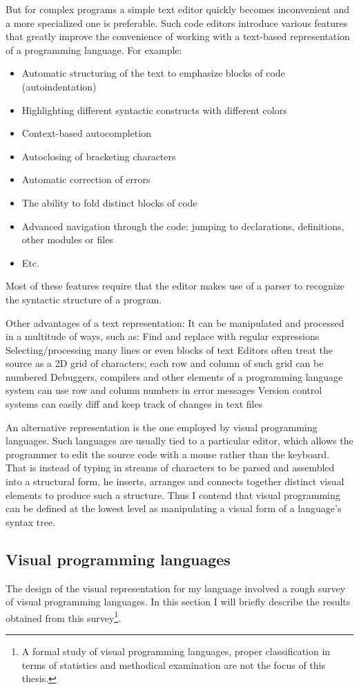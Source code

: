 But for complex programs a simple text editor quickly becomes inconvenient and a more specialized one is preferable. Such code editors introduce various features that greatly improve the convenience of working with a text-based representation of a programming language. For example:
\begin{itemize}
	\item Automatic structuring of the text to emphasize blocks of code (autoindentation)
	\item Highlighting different syntactic constructs with different colors
	\item Context-based autocompletion
	\item Autoclosing of bracketing characters
	\item Automatic correction of errors
	\item The ability to fold distinct blocks of code
	\item Advanced navigation through the code: jumping to declarations, definitions, other modules or files
	\item Etc.
\end{itemize}
Most of these features require that the editor makes use of a parser to recognize the syntactic structure of a program.

Other advantages of a text representation:
It can be manipulated and processed in a multitude of ways, such as:
Find and replace with regular expressions
Selecting/processing many lines or even blocks of text
Editors often treat the source as a 2D grid of characters; each row and column of such grid can be numbered
Debuggers, compilers and other elements of a programming language system can use row and column numbers in error messages
Version control systems can easily diff and keep track of changes in text files

An alternative representation is the one employed by visual programming languages. Such languages are usually tied to a particular editor, which allows the programmer to edit the source code with a mouse rather than the keyboard. That is instead of typing in streams of characters to be parsed and assembled into a structural form, he inserts, arranges and connects together distinct visual elements to produce such a structure. Thus I contend that visual programming can be defined at the lowest level as manipulating a visual form of a language's syntax tree.

\subsection{Visual programming languages}
The design of the visual representation for my language involved a rough survey of visual programming languages. In this section I will briefly describe the results obtained from this survey\footnote{A formal study of visual programming languages, proper classification in terms of statistics and methodical examination are not the focus of this thesis.}.

